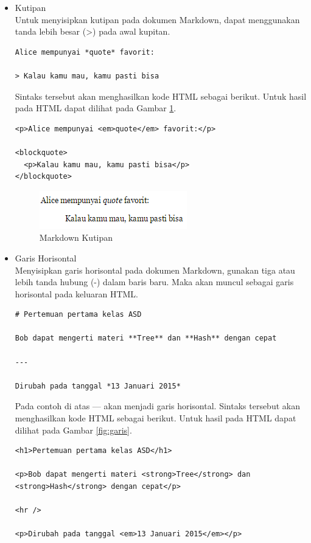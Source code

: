 \begin{itemize}
\item Kutipan\\
Untuk menyisipkan kutipan pada dokumen Markdown, dapat menggunakan tanda lebih besar (>) pada awal kupitan.
\begin{lstlisting}[basicstyle=\footnotesize]
Alice mempunyai *quote* favorit:

> Kalau kamu mau, kamu pasti bisa
\end{lstlisting}
Sintaks tersebut akan menghasilkan kode HTML sebagai berikut. Untuk
hasil pada HTML dapat dilihat pada Gambar \ref{fig:kutipan}.
\begin{lstlisting}[basicstyle=\footnotesize]
<p>Alice mempunyai <em>quote</em> favorit:</p>

<blockquote>
  <p>Kalau kamu mau, kamu pasti bisa</p>
</blockquote>
\end{lstlisting}
\begin{figure}[H]
\centering
\includegraphics[scale=1]{Gambar/kutipan.png}
\caption[Markdown Kutipan]{Markdown Kutipan}
\label{fig:kutipan}
\end{figure}

\item Garis Horisontal\\
Menyisipkan garis horisontal pada dokumen Markdown, gunakan tiga atau lebih tanda hubung (-) dalam baris baru. Maka akan muncul sebagai garis horisontal pada keluaran HTML.
\begin{lstlisting}[basicstyle=\footnotesize]
# Pertemuan pertama kelas ASD

Bob dapat mengerti materi **Tree** dan **Hash** dengan cepat

---

Dirubah pada tanggal *13 Januari 2015*
\end{lstlisting}
Pada contoh di atas --- akan menjadi garis horisontal. Sintaks tersebut akan
menghasilkan kode HTML sebagai berikut. Untuk hasil pada HTML dapat dilihat pada
Gambar \ref{fig:garis}.
\begin{lstlisting}[basicstyle=\footnotesize]
<h1>Pertemuan pertama kelas ASD</h1>

<p>Bob dapat mengerti materi <strong>Tree</strong> dan <strong>Hash</strong> dengan cepat</p>

<hr />

<p>Dirubah pada tanggal <em>13 Januari 2015</em></p>


\end{lstlisting}
\end{itemize}
